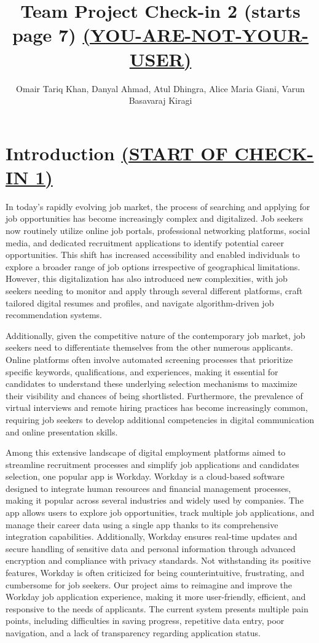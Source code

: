\documentclass[
	letterpaper, %
]{jdf}
\author{Omair Tariq Khan, Danyal Ahmad, Atul Dhingra, Alice Maria Giani, Varun Basavaraj Kiragi}
\title{Team Project Check-in 2 \textbf{(starts page 7)} \underline{\textbf{(YOU-ARE-NOT-YOUR-USER)}}}
\begin{document}

\maketitle
\hfill \break
\hfill \break

\section{Introduction \underline{(START OF CHECK-IN 1)}}
In today's rapidly evolving job market, the process of searching and applying for job opportunities has become increasingly complex and digitalized. Job seekers now routinely utilize online job portals, professional networking platforms, social media, and dedicated recruitment applications to identify potential career opportunities. This shift has increased accessibility and enabled individuals to explore a broader range of job options irrespective of geographical limitations. However, this digitalization has also introduced new complexities, with job seekers needing to monitor and apply through several different platforms, craft tailored digital resumes and profiles, and navigate algorithm-driven job recommendation systems.

Additionally, given the competitive nature of the contemporary job market, job seekers need to differentiate themselves from the other numerous applicants. Online platforms often involve automated screening processes that prioritize specific keywords, qualifications, and experiences, making it essential for candidates to understand these underlying selection mechanisms to maximize their visibility and chances of being shortlisted. Furthermore, the prevalence of virtual interviews and remote hiring practices has become increasingly common, requiring job seekers to develop additional competencies in digital communication and online presentation skills.

Among this extensive landscape of digital employment platforms aimed to streamline recruitment processes and simplify job applications and candidates selection, one popular app is Workday. Workday is a cloud-based software designed to integrate human resources and financial management processes, making it popular across several industries and widely used by companies. The app allows users to explore job opportunities, track multiple job applications, and manage their career data using a single app thanks to its comprehensive integration capabilities. Additionally, Workday ensures real-time updates and secure handling of sensitive data and personal information through advanced encryption and compliance with privacy standards. Not withstanding its positive features, Workday is often criticized for being counterintuitive, frustrating, and cumbersome for job seekers. Our project aims to reimagine and improve the Workday job application experience, making it more user-friendly, efficient, and responsive to the needs of applicants. The current system presents multiple pain points, including difficulties in saving progress, repetitive data entry, poor navigation, and a lack of transparency regarding application status.
\end{document}
